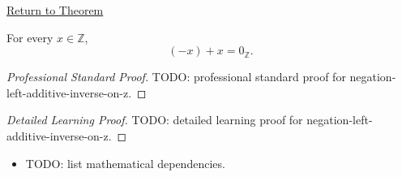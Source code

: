 \newpage
{}
\label{prf:negation-left-additive-inverse-on-z}

\begin{remark*}[Return]
\hyperref[thm:negation-left-additive-inverse-on-z]{Return to Theorem}
\end{remark*}

\begin{theorem*}
For every $x\in\mathbb{Z}$,
\[
(-x)+x=0_{\mathbb{Z}}.
\]
\end{theorem*}

\begin{proof}[Professional Standard Proof]
\LRAProofBodyStart
TODO: professional standard proof for negation-left-additive-inverse-on-z.
\end{proof}

\begin{proof}[Detailed Learning Proof]
\LRAProofBodyStart
TODO: detailed learning proof for negation-left-additive-inverse-on-z.
\end{proof}

\begin{remark*}
\end{remark*}

\begin{dependencies}
\begin{itemize}
  \item TODO: list mathematical dependencies.
\end{itemize}
\end{dependencies}

\clearpage

